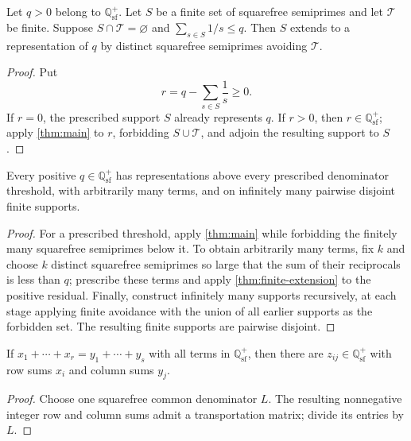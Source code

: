 \begin{theorem}
\label{thm:finite-extension}
Let $q>0$ belong to $\mathbb Q_{\mathrm{sf}}^+$.  Let $S$ be a finite set of squarefree semiprimes and let $\mathcal T$ be finite.  Suppose $S\cap\mathcal T=\varnothing$ and $\sum_{s\in S}1/s\leq q$.  Then $S$ extends to a representation of $q$ by distinct squarefree semiprimes avoiding $\mathcal T$.
\end{theorem}

\begin{proof}
Put
\[
 r=q-\sum_{s\in S}\frac1s\geq0.
\]
If $r=0$, the prescribed support $S$ already represents $q$.  If $r>0$, then $r\in\mathbb Q_{\mathrm{sf}}^+$; apply \cref{thm:main} to $r$, forbidding $S\cup\mathcal T$, and adjoin the resulting support to $S$.
\end{proof}

\begin{corollary}
\label{cor:qualitative-flexibility}
Every positive $q\in\mathbb Q_{\mathrm{sf}}^+$ has representations above every prescribed denominator threshold, with arbitrarily many terms, and on infinitely many pairwise disjoint finite supports.
\end{corollary}

\begin{proof}
For a prescribed threshold, apply \cref{thm:main} while forbidding the finitely many squarefree semiprimes below it.  To obtain arbitrarily many terms, fix $k$ and choose $k$ distinct squarefree semiprimes so large that the sum of their reciprocals is less than $q$; prescribe these terms and apply \cref{thm:finite-extension} to the positive residual.  Finally, construct infinitely many supports recursively, at each stage applying finite avoidance with the union of all earlier supports as the forbidden set.  The resulting finite supports are pairwise disjoint.
\end{proof}

\begin{theorem}
\label{thm:squarefree-row-column}
If $x_1+\cdots+x_r=y_1+\cdots+y_s$ with all terms in $\mathbb Q_{\mathrm{sf}}^+$, then there are $z_{ij}\in\mathbb Q_{\mathrm{sf}}^+$ with row sums $x_i$ and column sums $y_j$.
\end{theorem}

\begin{proof}
Choose one squarefree common denominator $L$.  The resulting nonnegative integer row and column sums admit a transportation matrix; divide its entries by $L$.
\end{proof}

